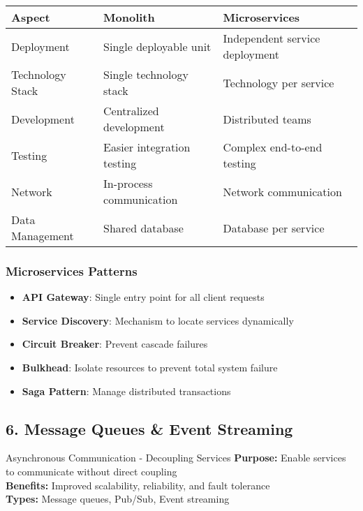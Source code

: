 \documentclass[10pt,a4paper]{article}
\begin{document}
\begin{table}[h]
\centering
\begin{tabular}{|p{3cm}|p{5cm}|p{5cm}|}
\hline
\textbf{Aspect} & \textbf{Monolith} & \textbf{Microservices} \\
\hline
Deployment & Single deployable unit & Independent service deployment \\
\hline
Technology Stack & Single technology stack & Technology per service \\
\hline
Development & Centralized development & Distributed teams \\
\hline
Testing & Easier integration testing & Complex end-to-end testing \\
\hline
Network & In-process communication & Network communication \\
\hline
Data Management & Shared database & Database per service \\
\hline
\end{tabular}
\end{table}

\subsubsection{Microservices Patterns}
\begin{itemize}
\item \textbf{API Gateway}: Single entry point for all client requests
\item \textbf{Service Discovery}: Mechanism to locate services dynamically
\item \textbf{Circuit Breaker}: Prevent cascade failures
\item \textbf{Bulkhead}: Isolate resources to prevent total system failure
\item \textbf{Saga Pattern}: Manage distributed transactions
\end{itemize}

\subsection{6. Message Queues \& Event Streaming}

\begin{conceptbox}{Asynchronous Communication - Decoupling Services}
\textbf{Purpose:} Enable services to communicate without direct coupling\\
\textbf{Benefits:} Improved scalability, reliability, and fault tolerance\\
\textbf{Types:} Message queues, Pub/Sub, Event streaming
\end{conceptbox}
\end{document}
